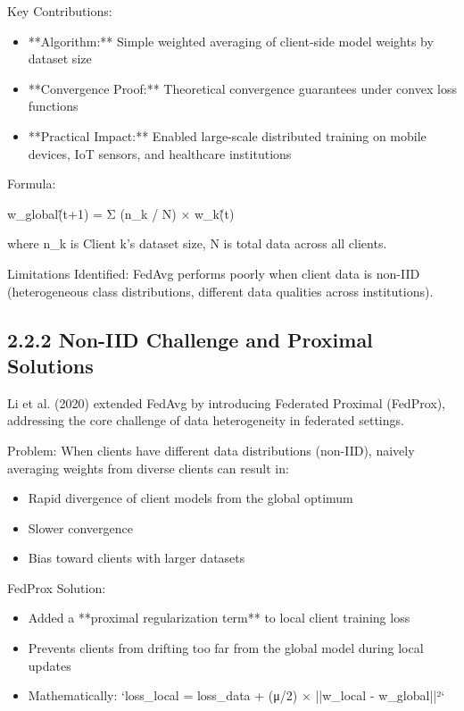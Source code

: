 Key Contributions:

\begin{itemize}
  \item **Algorithm:** Simple weighted averaging of client-side model weights by dataset size
  \item **Convergence Proof:** Theoretical convergence guarantees under convex loss functions
  \item **Practical Impact:** Enabled large-scale distributed training on mobile devices, IoT sensors, and healthcare institutions
\end{itemize}

Formula:

w\_global\^(t+1) = Σ (n\_k / N) × w\_k\^(t)

where n\_k is Client k's dataset size, N is total data across all clients.

Limitations Identified: FedAvg performs poorly when client data is non-IID (heterogeneous class distributions, different data qualities across institutions).


\subsection{2.2.2 Non-IID Challenge and Proximal Solutions}
Li et al. (2020) extended FedAvg by introducing Federated Proximal (FedProx), addressing the core challenge of data heterogeneity in federated settings.

Problem: When clients have different data distributions (non-IID), naively averaging weights from diverse clients can result in:

\begin{itemize}
  \item Rapid divergence of client models from the global optimum
  \item Slower convergence
  \item Bias toward clients with larger datasets
\end{itemize}

FedProx Solution:

\begin{itemize}
  \item Added a **proximal regularization term** to local client training loss
  \item Prevents clients from drifting too far from the global model during local updates
  \item Mathematically: `loss\_local = loss\_data + (μ/2) × ||w\_local - w\_global||²`
\end{itemize}

